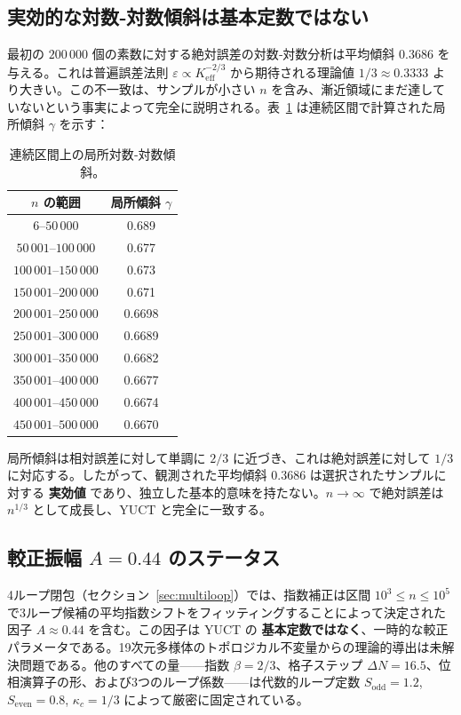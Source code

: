 \documentclass[11pt,a4paper]{article}
\begin{document}
	\subsection{実効的な対数‐対数傾斜は基本定数ではない}
	最初の \(200\,000\) 個の素数に対する絶対誤差の対数‐対数分析は平均傾斜 \(0.3686\) を与える。これは普遍誤差法則 \(\varepsilon \propto K_{\mathrm{eff}}^{-2/3}\) から期待される理論値 \(1/3 \approx 0.3333\) より大きい。この不一致は、サンプルが小さい \(n\) を含み、漸近領域にまだ達していないという事実によって完全に説明される。表~\ref{tab:local-slopes} は連続区間で計算された局所傾斜 \(\gamma\) を示す：
	\begin{table}[htbp]
		\centering
		\caption{連続区間上の局所対数‐対数傾斜。}
		\label{tab:local-slopes}
		\begin{tabular}{c c}
			\toprule
			\(n\) の範囲 & 局所傾斜 \(\gamma\) \\
			\midrule
			\(6\)--\(50\,000\)    & 0.689 \\
			\(50\,001\)--\(100\,000\) & 0.677 \\
			\(100\,001\)--\(150\,000\)& 0.673 \\
			\(150\,001\)--\(200\,000\)& 0.671 \\
			\(200\,001\)--\(250\,000\)& 0.6698 \\
			\(250\,001\)--\(300\,000\)& 0.6689 \\
			\(300\,001\)--\(350\,000\)& 0.6682 \\
			\(350\,001\)--\(400\,000\)& 0.6677 \\
			\(400\,001\)--\(450\,000\)& 0.6674 \\
			\(450\,001\)--\(500\,000\)& 0.6670 \\
			\bottomrule
		\end{tabular}
	\end{table}
	局所傾斜は相対誤差に対して単調に \(2/3\) に近づき、これは絶対誤差に対して \(1/3\) に対応する。したがって、観測された平均傾斜 \(0.3686\) は選択されたサンプルに対する \textbf{実効値} であり、独立した基本的意味を持たない。\(n\to\infty\) で絶対誤差は \(n^{1/3}\) として成長し、YUCT と完全に一致する。
	
	\subsection{較正振幅 \(A=0.44\) のステータス}
	4ループ閉包（セクション~\ref{sec:multiloop}）では、指数補正は区間 \(10^3\le n\le 10^5\) で3ループ候補の平均指数シフトをフィッティングすることによって決定された因子 \(A \approx 0.44\) を含む。この因子は YUCT の \textbf{基本定数ではなく}、一時的な較正パラメータである。19次元多様体のトポロジカル不変量からの理論的導出は未解決問題である。他のすべての量——指数 \(\beta=2/3\)、格子ステップ \(\Delta N=16.5\)、位相演算子の形、および3つのループ係数——は代数的ループ定数 \(S_{\mathrm{odd}}=1.2\), \(S_{\mathrm{even}}=0.8\), \(\kappa_c=1/3\) によって厳密に固定されている。
	
\end{document}
